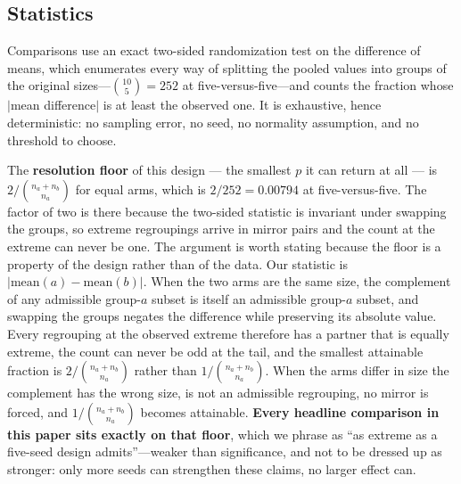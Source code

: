 \subsection{Statistics}
\label{sec:stats}

Comparisons use an exact two-sided randomization test on the difference of means,
which enumerates every way of splitting the pooled values into groups of the
original sizes---$\binom{10}{5} = 252$ at five-versus-five---and counts the
fraction whose $|$mean difference$|$ is at least the observed one. It is
exhaustive, hence deterministic: no sampling error, no seed, no normality
assumption, and no threshold to choose.

The \textbf{resolution floor} of this design --- the smallest $p$ it can return at
all --- is $2/\binom{n_a+n_b}{n_a}$ for equal arms, which is $2/252 = 0.00794$ at
five-versus-five. The factor of two is there because the two-sided statistic is
invariant under swapping the groups, so extreme regroupings arrive in mirror pairs
and the count at the extreme can never be one.
The argument is worth stating because the floor is a property of the design rather
than of the data. Our statistic is $|\mathrm{mean}(a) - \mathrm{mean}(b)|$. When
the two arms are the same size, the complement of any admissible group-$a$ subset
is itself an admissible group-$a$ subset, and swapping the groups negates the
difference while preserving its absolute value. Every regrouping at the observed
extreme therefore has a partner that is equally extreme, the count can never be
odd at the tail, and the smallest attainable fraction is $2/\binom{n_a+n_b}{n_a}$
rather than $1/\binom{n_a+n_b}{n_a}$. When the arms differ in size the complement
has the wrong size, is not an admissible regrouping, no mirror is forced, and
$1/\binom{n_a+n_b}{n_a}$ becomes attainable.
\textbf{Every headline comparison in this paper sits exactly on that floor}, which
we phrase as ``as extreme as a five-seed design admits''---weaker than
significance, and not to be dressed up as stronger: only more seeds can
strengthen these claims, no larger effect can.

